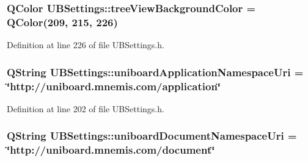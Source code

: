 \hypertarget{class_u_b_settings_ac66b5261e771dc368fb2e457d3d988e5}{
\subsubsection[{tree\-View\-Background\-Color}]{\setlength{\rightskip}{0pt plus 5cm}Q\-Color U\-B\-Settings\-::tree\-View\-Background\-Color = Q\-Color(209, 215, 226)\hspace{0.3cm}{\ttfamily [static]}}}\label{db/d66/class_u_b_settings_ac66b5261e771dc368fb2e457d3d988e5}


Definition at line 226 of file U\-B\-Settings.\-h.

\hypertarget{class_u_b_settings_a20733676315376a77a45d82895e592a9}{
\subsubsection[{uniboard\-Application\-Namespace\-Uri}]{\setlength{\rightskip}{0pt plus 5cm}Q\-String U\-B\-Settings\-::uniboard\-Application\-Namespace\-Uri = \char`\"{}http\-://uniboard.\-mnemis.\-com/application\char`\"{}\hspace{0.3cm}{\ttfamily [static]}}}\label{db/d66/class_u_b_settings_a20733676315376a77a45d82895e592a9}


Definition at line 202 of file U\-B\-Settings.\-h.

\hypertarget{class_u_b_settings_a17fa3676f5ab483e7125b9ed2c3dfef4}{
\subsubsection[{uniboard\-Document\-Namespace\-Uri}]{\setlength{\rightskip}{0pt plus 5cm}Q\-String U\-B\-Settings\-::uniboard\-Document\-Namespace\-Uri = \char`\"{}http\-://uniboard.\-mnemis.\-com/document\char`\"{}\hspace{0.3cm}{\ttfamily [static]}}}\label{db/d66/class_u_b_settings_a17fa3676f5ab483e7125b9ed2c3dfef4}


